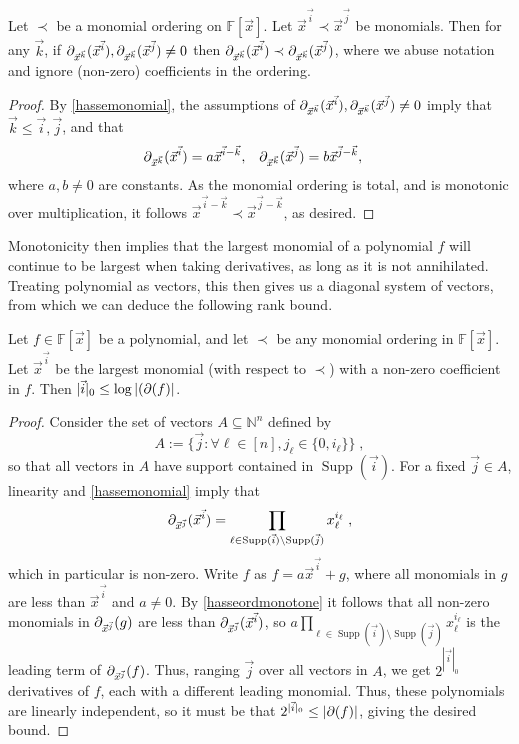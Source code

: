 \documentclass[letterpaper,11pt]{article}
\numberwithin{equation}{section}
\theoremstyle{plain}
\theoremstyle{remark}
\DeclareMathOperator{\supp}{Supp}
\newcommand{\F}{\mathbb{F}}
\newcommand{\N}{\mathbb{N}}
\newcommand{\eqdef}{:=}
\begin{document}
\begin{lemma}
	\label{hasseordmonotone}
	Let $\prec$ be a monomial ordering on $\F[\vec{x}]$. Let $\vec{x}^{\vec{i}}\prec\vec{x}^{\vec{j}}$ be monomials.  Then for any $\vec{k}$, if
	$\partial_{\vec{x}^{\vec{k}}}(\vec{x}^{\vec{i}}),\partial_{\vec{x}^{\vec{k}}}(\vec{x}^{\vec{j}})\ne 0$ then $\partial_{\vec{x}^{\vec{k}}}(\vec{x}^{\vec{i}}) \prec \partial_{\vec{x}^{\vec{k}}}(\vec{x}^{\vec{j}})$, where we abuse notation and ignore (non-zero) coefficients in the ordering.
\end{lemma}
\begin{proof}
	By \autoref{hassemonomial}, the assumptions of $\partial_{\vec{x}^{\vec{k}}}(\vec{x}^{\vec{i}}),\partial_{\vec{x}^{\vec{k}}}(\vec{x}^{\vec{j}})\ne 0$ imply that $\vec{k}\le\vec{i},\vec{j}$, and that
	\begin{align*}
		\partial_{\vec{x}^{\vec{k}}}(\vec{x}^{\vec{i}})
		&=a\vec{x}^{\vec{i}-\vec{k}},
		&\partial_{\vec{x}^{\vec{k}}}(\vec{x}^{\vec{j}})
		&=b\vec{x}^{\vec{j}-\vec{k}},
	\end{align*}
	where $a,b\ne 0$ are constants.  As the monomial ordering is total, and is monotonic over multiplication, it follows $\vec{x}^{\vec{i}-\vec{k}}\prec\vec{x}^{\vec{j}-\vec{k}}$, as desired.
\end{proof}

Monotonicity then implies that the largest monomial of a polynomial $f$ will continue to be largest when taking derivatives, as long as it is not annihilated.  Treating polynomial as vectors, this then gives us a diagonal system of vectors, from which we can deduce the following rank bound.

\begin{theorem}
	\label{smallmonomial}
	Let $f\in\F[\vec{x}]$ be a polynomial, and let $\prec$ be any monomial ordering in $\F[\vec{x}]$. Let $\vec{x}^{\vec{i}}$ be the largest monomial (with respect to $\prec$) with a non-zero coefficient in $f$.  Then $|\vec{i}|_0\le\log|(\partial(f)|$.
\end{theorem}
\begin{proof}
	Consider the set of vectors $A\subseteq \N^n$ defined by
	\[
		A\eqdef\{\vec{j}: \forall \ell\in[n], j_\ell\in\{0,i_\ell\}\}\;,
	\]
	so that all vectors in $A$ have support contained in $\supp(\vec{i})$.	For a fixed $\vec{j}\in A$, linearity and \autoref{hassemonomial} imply that
	\[
		\hasse_{\vec{x}^{\vec{j}}}(\vec{x}^{\vec{i}})=\prod_{\ell\in \supp(\vec{i})\setminus\supp(\vec{j})}x_\ell^{i_\ell}\;,
	\]
	which in particular is non-zero. Write $f$ as $f=a\vec{x}^{\vec{i}}+g$, where all monomials in $g$ are less than $\vec{x}^{\vec{i}}$ and $a\ne 0$.  By \autoref{hasseordmonotone} it follows that all non-zero monomials in $\partial_{\vec{x}^{\vec{j}}}(g)$ are less than $\partial_{\vec{x}^{\vec{j}}}(\vec{x}^{\vec{i}})$, so $a\prod_{\ell\in \supp(\vec{i})\setminus\supp(\vec{j})}x_\ell^{i_\ell}$ is the leading term of $\partial_{\vec{x}^{\vec{j}}}(f)$. Thus, ranging $\vec{j}$ over all vectors in $A$, we get $2^{|\vec{i}|_0}$ derivatives of $f$, each with a different leading monomial.  Thus, these polynomials are linearly independent, so it must be that $2^{|\vec{i}|_0}\le|\partial(f)|$, giving the desired bound.
\end{proof}
\end{document}
